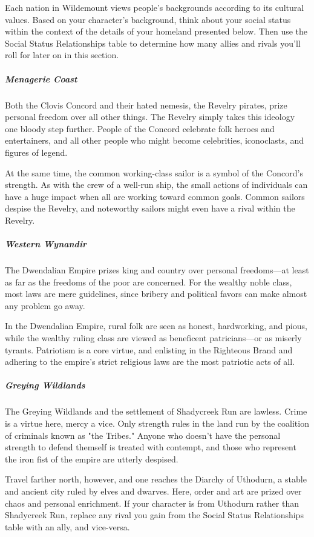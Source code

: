 \documentclass[10pt,a4paper,twoside,bg=print,twocolumn,openany,nodeprecatedcode]{dndbook}
\begin{document}
Each nation in Wildemount views people's backgrounds according to its cultural values. Based on your character's background, think about your social status within the context of the details of your homeland presented below. Then use the Social Status Relationships table to determine how many allies and rivals you'll roll for later on in this section.

\subparagraph{Menagerie Coast}
Both the Clovis Concord and their hated nemesis, the Revelry pirates, prize personal freedom over all other things. The Revelry simply takes this ideology one bloody step further. People of the Concord celebrate folk heroes and entertainers, and all other people who might become celebrities, iconoclasts, and figures of legend.

At the same time, the common working-class sailor is a symbol of the Concord's strength. As with the crew of a well-run ship, the small actions of individuals can have a huge impact when all are working toward common goals. Common sailors despise the Revelry, and noteworthy sailors might even have a rival within the Revelry.

\subparagraph{Western Wynandir}
The Dwendalian Empire prizes king and country over personal freedoms—at least as far as the freedoms of the poor are concerned. For the wealthy noble class, most laws are mere guidelines, since bribery and political favors can make almost any problem go away.

In the Dwendalian Empire, rural folk are seen as honest, hardworking, and pious, while the wealthy ruling class are viewed as beneficent patricians—or as miserly tyrants. Patriotism is a core virtue, and enlisting in the Righteous Brand and adhering to the empire's strict religious laws are the most patriotic acts of all.

\subparagraph{Greying Wildlands}
The Greying Wildlands and the settlement of Shadycreek Run are lawless. Crime is a virtue here, mercy a vice. Only strength rules in the land run by the coalition of criminals known as "the Tribes." Anyone who doesn't have the personal strength to defend themself is treated with contempt, and those who represent the iron fist of the empire are utterly despised.

Travel farther north, however, and one reaches the Diarchy of Uthodurn, a stable and ancient city ruled by elves and dwarves. Here, order and art are prized over chaos and personal enrichment. If your character is from Uthodurn rather than Shadycreek Run, replace any rival you gain from the Social Status Relationships table with an ally, and vice-versa.
\end{document}
